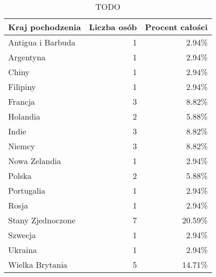 \begin{table}[h!]
    \begin{center}
        \begin{tabular}{|l|r|r|}
            \hline
            Kraj pochodzenia  & Liczba osób & Procent całości \\
            \hline
            Antigua i Barbuda & 1           & 2.94\%          \\
            Argentyna         & 1           & 2.94\%          \\
            Chiny             & 1           & 2.94\%          \\
            Filipiny          & 1           & 2.94\%          \\
            Francja           & 3           & 8.82\%          \\
            Holandia          & 2           & 5.88\%          \\
            Indie             & 3           & 8.82\%          \\
            Niemcy            & 3           & 8.82\%          \\
            Nowa Zelandia     & 1           & 2.94\%          \\
            Polska            & 2           & 5.88\%          \\
            Portugalia        & 1           & 2.94\%          \\
            Rosja             & 1           & 2.94\%          \\
            Stany Zjednoczone & 7           & 20.59\%         \\
            Szwecja           & 1           & 2.94\%          \\
            Ukraina           & 1           & 2.94\%          \\
            Wielka Brytania   & 5           & 14.71\%         \\
            \hline
        \end{tabular}
    \end{center}
    \caption{TODO}\label{tab1:ch7_3}
\end{table}

